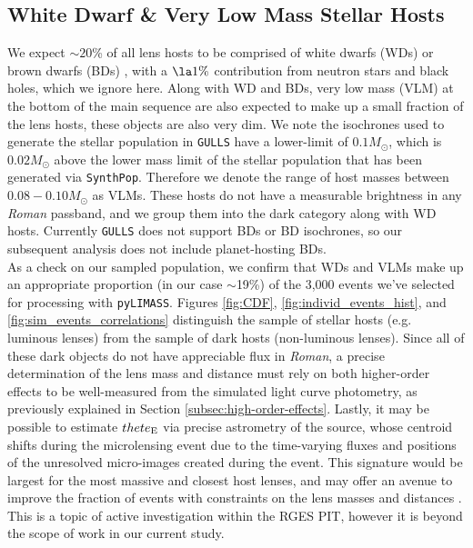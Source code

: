 \documentclass[twocolumn]{aastex631}
\begin{document}
\subsection{White Dwarf \& Very Low Mass Stellar Hosts} \label{sec:bdwds}
We expect ${\sim}20$\% of all lens hosts to be comprised of white dwarfs (WDs) or brown dwarfs (BDs) \citep{gould:2000a, bennett:2007a, gaudi:2012a}, with a $\la 1\%$ contribution from neutron stars and black holes, which we ignore here. Along with WD and BDs, very low mass (VLM) at the bottom of the main sequence are also expected to make up a small fraction of the lens hosts, these objects are also very dim. We note the isochrones used to generate the stellar population in \texttt{GULLS} have a lower-limit of $0.1M_{\odot}$, which is $0.02M_{\odot}$ above the lower mass limit of the stellar population that has been generated via \texttt{SynthPop}. Therefore we denote the range of host masses between $0.08-0.10M_{\odot}$ as VLMs. These hosts do not have a measurable brightness in any \textit{Roman} passband, and we group them into the dark category along with WD hosts. Currently \texttt{GULLS} does not support BDs or BD isochrones, so our subsequent analysis does not include planet-hosting BDs.\\
\indent As a check on our sampled population, we confirm that WDs and VLMs make up an appropriate proportion (in our case ${\sim}$19\%) of the 3,000 events we've selected for processing with \texttt{pyLIMASS}. Figures \ref{fig:CDF}, \ref{fig:individ_events_hist}, and \ref{fig:sim_events_correlations} distinguish the sample of stellar hosts (e.g. luminous lenses) from the sample of dark hosts (non-luminous lenses). Since all of these dark objects do not have appreciable flux in \textit{Roman}, a precise determination of the lens mass and distance must rely on both higher-order effects to be well-measured from the simulated light curve photometry, as previously explained in Section \ref{subsec:high-order-effects}. Lastly, it may be possible to estimate $thete_{\rm E}$ via precise astrometry of the source, whose centroid shifts during the microlensing event due to the time-varying fluxes and positions of the unresolved micro-images created during the event. This signature would be largest for the most massive and closest host lenses, and may offer an avenue to improve the fraction of events with constraints on the lens masses and distances \citep{dominik:2000a,lam:2023a,sajadian:2023a}. This is a topic of active investigation within the RGES PIT, however it is beyond the scope of work in our current study.
\end{document}
